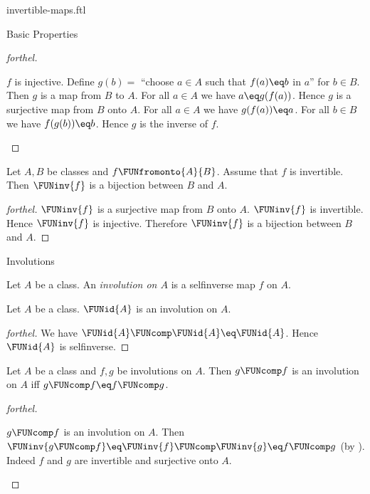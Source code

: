 \documentclass{naproche-library}
\begin{document}
\begin{smodule}[title=Invertible Maps]{invertible-maps.ftl}
\begin{sfragment}{Basic Properties}
\begin{proof}[forthel]
    \begin{case}{$f$ is injective.}
      Define $g(b) =$ ``choose $a \in A$ such that $f(a) \eq b$ in $a$'' for
      $b \in B$.
      Then $g$ is a map from $B$ to $A$.
      For all $a \in A$ we have $a \eq g(f(a))$.
      Hence $g$ is a surjective map from $B$ onto $A$.
      For all $a \in A$ we have $g(f(a)) \eq a$.
      For all $b \in B$ we have $f(g(b)) \eq b$.
      Hence $g$ is the inverse of $f$.
    \end{case}
  \end{proof}

  \begin{corollary}[forthel,id=FOUNDATIONS_09_5708971514003456]
    Let $A, B$ be classes and $f \FUNfromonto{A}{B}$.
    Assume that $f$ is invertible.
    Then $\FUNinv{f}$ is a bijection between $B$ and $A$.
  \end{corollary}
  \begin{proof}[forthel]
    $\FUNinv{f}$ is a surjective map from $B$ onto $A$.
    $\FUNinv{f}$ is invertible.
    Hence $\FUNinv{f}$ is injective.
    Therefore $\FUNinv{f}$ is a bijection between $B$ and $A$.
  \end{proof}
\end{sfragment}

\begin{sfragment}{Involutions}
  \begin{definition}[forthel,id=FOUNDATIONS_09_7282039688527872]
    Let $A$ be a class.
    An \emph{involution on $A$} is a selfinverse map $f$ on $A$.
  \end{definition}

  \begin{proposition}[forthel,id=FOUNDATIONS_09_7944474185433088]
    Let $A$ be a class.
    $\FUNid{A}$ is an involution on $A$.
  \end{proposition}
  \begin{proof}[forthel]
    We have $\FUNid{A} \FUNcomp \FUNid{A} \eq \FUNid{A}$.
    Hence $\FUNid{A}$ is selfinverse.
  \end{proof}

  \begin{proposition}[forthel,id=FOUNDATIONS_09_6897019612299264]
    Let $A$ be a class and $f, g$ be involutions on $A$.
    Then $g \FUNcomp f$ is an involution on $A$ iff $g \FUNcomp f \eq f \FUNcomp g$.
  \end{proposition}
  \begin{proof}[forthel]
    \begin{case}{$g \FUNcomp f$ is an involution on $A$.}
      Then $\FUNinv{g \FUNcomp f}
        \eq \FUNinv{f} \FUNcomp \FUNinv{g}
        \eq f \FUNcomp g$
      (by ).
      Indeed $f$ and $g$ are invertible and surjective onto $A$.
    \end{case}


\end{proof}
\end{sfragment}
\end{smodule}
\end{document}
